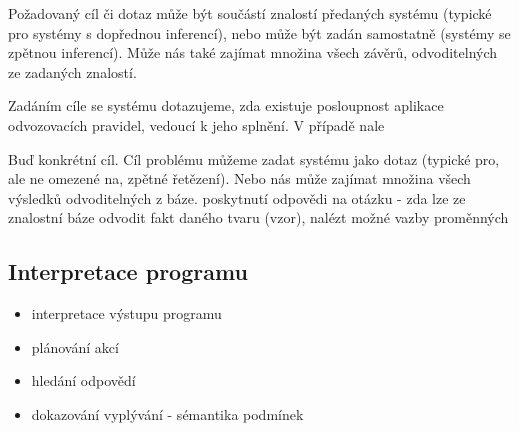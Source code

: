 Požadovaný cíl či dotaz může být součástí znalostí předaných systému (typické
pro systémy s dopřednou inferencí), nebo může být zadán samostatně (systémy se
zpětnou inferencí). Může nás také zajímat množina všech závěrů, odvoditelných ze
zadaných znalostí.

Zadáním cíle se systému dotazujeme, zda existuje posloupnost aplikace
odvozovacích pravidel, vedoucí k jeho splnění. V případě nale

Buď konkrétní cíl.
Cíl problému můžeme zadat systému jako dotaz (typické pro, ale ne omezené na,
zpětné řetězení).
Nebo nás může zajímat množina všech výsledků odvoditelných z báze.
poskytnutí odpovědi na otázku - zda lze ze znalostní báze odvodit fakt daného
tvaru (vzor), nalézt možné vazby proměnných

\subsection{Interpretace programu}
\begin{framed}
  \begin{itemize}
    \item interpretace výstupu programu
    \item plánování akcí
    \item hledání odpovědí
    \item dokazování vyplývání - sémantika podmínek
  \end{itemize}
\end{framed}

